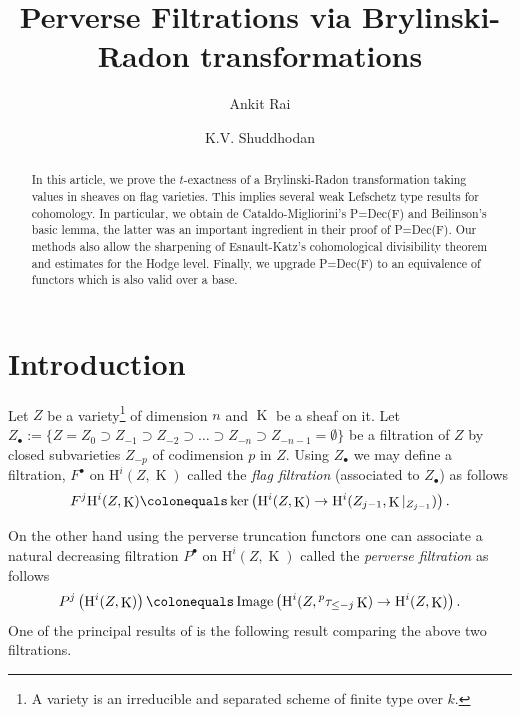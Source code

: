 \documentclass[12pt, reqno]{amsart}
\title{Perverse Filtrations via Brylinski-Radon transformations}
\author{Ankit Rai}
\author{K.V. Shuddhodan}
\theoremstyle{plain}
\theoremstyle{definition}
\theoremstyle{definition}
\DeclareMathOperator{\KK}{K}
\DeclareMathOperator{\im}{Image}
\begin{document}
\maketitle
\begin{abstract}
In this article, we prove the $t$-exactness of a Brylinski-Radon transformation taking values in sheaves on flag varieties. This implies several weak Lefschetz type results for cohomology. In particular, we obtain de Cataldo-Migliorini's P=Dec(F) and Beilinson's basic lemma, the latter was an important ingredient in their proof of P=Dec(F). Our methods also allow the sharpening of Esnault-Katz's cohomological divisibility theorem and estimates for the Hodge level. Finally, we upgrade P=Dec(F) to an equivalence of functors which is also valid over a base.
\end{abstract}

\setcounter{tocdepth}{1}
\tableofcontents


\section{Introduction}

Let $Z$ be a variety\footnote{A variety is an irreducible and separated scheme of finite type over $k$.} of dimension $n$ and $\KK$ be a sheaf on it. Let $Z_{\bullet}:=\lbrace Z = Z_0 \supset Z_{-1} \supset Z_{-2} \supset \dots \supset Z_{-n} \supset Z_{-n-1} = \emptyset \rbrace$ be a filtration of $Z$ by closed subvarieties $Z_{-p}$ of codimension $p$ in $Z$. Using $Z_{\bullet}$ we may define a filtration, $F^{\bullet}$ on $\mathrm{H}^i(Z, \KK)$ called the \textit{flag filtration} (associated to $Z_{\bullet}$) as follows
\begin{equation} \label{eqn:geometric-filtration-def}
    F^j\mathrm{H}^i(Z, \KK) \colonequals \ker\left( \mathrm{H}^i(Z, \KK) \rightarrow \mathrm{H}^i(Z_{j-1}, \KK|_{Z_{j-1}})\right).
\end{equation}

On the other hand using the perverse truncation functors one can associate a natural decreasing filtration $P^{\bullet}$ on $\mathrm{H}^i(Z, \KK)$ called the \textit{perverse filtration} as follows
\begin{equation} \label{eqn:perverse-filtration-def}
    P^j\left( \mathrm{H}^i(Z, \KK)\right) \colonequals \im\left( \mathrm{H}^i(Z, {}^p\tau_{\leq -j}\KK) \rightarrow \mathrm{H}^i(Z, \KK)\right).
\end{equation}
One of the principal results of \cite{deCM10} is the following result comparing the above two filtrations.
\end{document}
